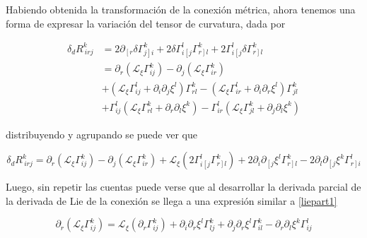 \documentclass{article}
\numberwithin{equation}{section}
\begin{document}
Habiendo obtenida la transformación de la conexión métrica, ahora tenemos una forma de expresar la variación del tensor de curvatura, dada por

\begin{equation*}
\begin{aligned}
\delta_d R^{k}_{ \ i r j} &= 2 \partial_{\left[ r \right.} \delta \Gamma^{k}_{\left. j \right] i} +   2\delta \Gamma^l_{i\left[ j \right.}\Gamma^{k}_{ \left. r \right] l} + 2\Gamma^l_{i\left[ j \right.}\delta \Gamma^{k}_{ \left. r \right] l}\\
&= \partial_r \left( \mathcal{L}_{\xi} \Gamma^{k}_{i j}\right) - \partial_j \left( \mathcal{L}_{\xi} \Gamma^{k}_{i r}\right)\\
&+\left( \mathcal{L}_{\xi} \Gamma^l_{i j}  + \partial_i \partial_j \xi^l \right) \Gamma^{k}_{r l} - \left( \mathcal{L}_{\xi} \Gamma^l_{i r}  + \partial_i \partial_r \xi^l \right)\Gamma^{k}_{j l}\\
&+ \Gamma^l_{i j} \left( \mathcal{L}_{\xi} \Gamma^{k}_{r l}  + \partial_r \partial_l \xi^{k} \right) - \Gamma^l_{i r} \left( \mathcal{L}_{\xi} \Gamma^{k}_{j l}  + \partial_j \partial_l \xi^{k} \right)
\end{aligned}
\end{equation*}

distribuyendo y agrupando se puede ver que

\begin{equation}\label{varcurv}
\delta_d R^{k}_{ \ i r j} =  \partial_r \left( \mathcal{L}_{\xi} \Gamma^{k}_{i j}\right) - \partial_j \left( \mathcal{L}_{\xi} \Gamma^{k}_{i r}\right) + \mathcal{L}_{\xi} \left(2\Gamma^l_{i\left[ j \right.}\Gamma^{k}_{ \left. r \right] l}\right) +
2 \partial_i \partial_{\left[ \right. j} \xi^l \Gamma^{k}_{\left. r \right] l} - 2 \partial_l \partial_{ \left[ \right. j} \xi^{k} \Gamma^l_{\left. r \right] i} 
\end{equation}

Luego, sin repetir las cuentas puede verse que al desarrollar la derivada parcial de la derivada de Lie de la conexión se llega a una expresión similar a \ref{liepart1}

\begin{equation*}
\partial_r \left( \mathcal{L}_{\xi} \Gamma^{k}_{i j}\right) = \mathcal{L}_{\xi} \left(\partial_r \Gamma^{k}_{i j}\right) + \partial_i \partial_r \xi^l \Gamma^{k}_{l j} + \partial_j \partial_r \xi^l \Gamma^{k}_{ i l} - \partial_r \partial_l \xi^k \Gamma^l_{ i  j}
\end{equation*}
\end{document}
